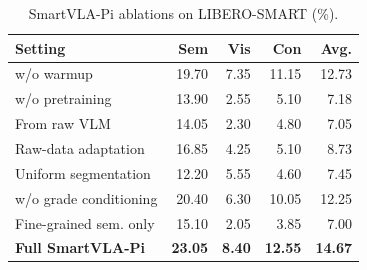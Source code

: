 \begin{table}
\centering
\setlength{\abovecaptionskip}{0pt}
\setlength{\belowcaptionskip}{\baselineskip}
\caption{\centering SmartVLA-Pi ablations on \mbox{LIBERO-SMART} (\%).}
\label{tab:ablation}
\normalsize
\setlength{\tabcolsep}{3pt}
\begin{tabular}{@{}lrrrr@{}}
\toprule
Setting & Sem & Vis & Con & Avg. \\
\midrule
w/o warmup & 19.70 & 7.35 & 11.15 & 12.73 \\
w/o pretraining & 13.90 & 2.55 & 5.10 & 7.18 \\
From raw VLM & 14.05 & 2.30 & 4.80 & 7.05 \\
Raw-data adaptation & 16.85 & 4.25 & 5.10 & 8.73 \\
Uniform segmentation & 12.20 & 5.55 & 4.60 & 7.45 \\
w/o grade conditioning & 20.40 & 6.30 & 10.05 & 12.25 \\
Fine-grained sem. only & 15.10 & 2.05 & 3.85 & 7.00 \\
\midrule
\rowcolor{smartvlarow}
\textbf{Full SmartVLA-Pi} & \textbf{23.05} & \textbf{8.40} & \textbf{12.55} & \textbf{14.67} \\
\bottomrule
\end{tabular}
\end{table}
